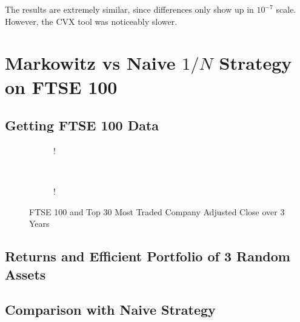 \documentclass[11pt]{article}
\begin{document}
The results are extremely similar, since differences only show up in $10^{-7}$ scale. However, the
CVX tool was noticeably slower.

\section{Markowitz vs Naive $1/N$ Strategy on FTSE 100}

\subsection{Getting FTSE 100 Data}

\begin{figure}[!h]
   \centering 
   \begin{subfigure}[b]{0.23\textwidth}
     	\resizebox {\textwidth} {!} { }
		\label{fig:q2-ftse}
    \end{subfigure}
    ~
    \begin{subfigure}[b]{0.23\textwidth}
       	\resizebox {\textwidth} {!} { }
        \label{fig:q2_returns}
    \end{subfigure}
	\vspace{-0.5cm}
    \caption{FTSE 100 and Top 30 Most Traded Company Adjusted Close over 3 Years}\label{fig:naive_v_cvx}
\end{figure}

\subsection{Returns and Efficient Portfolio of 3 Random Assets}

\subsection{Comparison with Naive Strategy}
\end{document}
